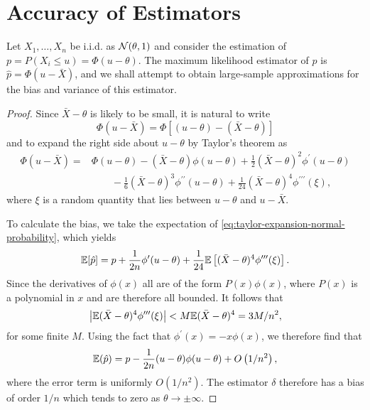 \section{Accuracy of Estimators}

\begin{example}
	Let $X_{1},\ldots,X_{n}$ be i.i.d. as ${\mathcal N}(\theta,1)$ and consider the estimation of $p=P\left(X_{i}\leq u\right)=\Phi(u-\theta)$. The maximum likelihood estimator of $p$ is $\hat{p}=\Phi(u-\bar{X})$, and we shall attempt to obtain large-sample approximations for the bias and variance of this estimator.
\end{example}

\begin{proof}
	Since $\bar{X}-\theta$ is likely to be small, it is natural to write
	\begin{equation*}
		\Phi(u-\bar{X})=\Phi[(u-\theta)-(\bar{X}-\theta)]
	\end{equation*}
	and to expand the right side about $u-\theta$ by Taylor's theorem as
	\begin{equation}
		\label{eq:taylor-expansion-normal-probability}
		\begin{aligned}
			\Phi(u-\bar{X})= & \Phi(u-\theta)-(\bar{X}-\theta)\phi(u-\theta)+\frac{1}{2}(\bar{X}-\theta)^{2}\phi^{\prime}(u-\theta)                                  \\
			                 & \qquad -\frac{1}{6}(\bar{X}-\theta)^{3}\phi^{\prime\prime}(u-\theta)+\frac{1}{24}(\bar{X}-\theta)^{4}\phi^{\prime\prime \prime}(\xi),
		\end{aligned}
	\end{equation}
	where $\xi$ is a random quantity that lies between $u-\theta$ and $u-\bar{X}$.

	To calculate the bias, we take the expectation of \eqref{eq:taylor-expansion-normal-probability}, which yields
	\begin{equation*}
		{\mathbb E}[\hat{p}]=p+\frac{1}{2n}\phi^{\prime}(u-\theta)+\frac{1}{24}{\mathbb E}\left[(\bar{X}-\theta)^4\phi^{\prime\prime\prime}(\xi)\right].
	\end{equation*}
	Since the derivatives of $\phi(x)$ all are of the form $P(x)\phi(x)$, where $P(x)$ is a polynomial in $x$ and are therefore all bounded. It follows that
	\begin{equation*}
		\left|{\mathbb E}(\bar{X}-\theta)^{4}\phi^{\prime\prime\prime}(\xi)\right|<M{\mathbb E}(\bar{X}-\theta)^{4}=3M/n^2,
	\end{equation*}
	for some finite $M$. Using the fact that $\phi^{\prime}(x)=-x \phi(x)$, we therefore find that
	\begin{equation*}
		{\mathbb E}(\hat{p})=p-\frac{1}{2n}(u-\theta)\phi(u-\theta)+O\left(1/n^{2}\right),
	\end{equation*}
	where the error term is uniformly $O\left(1 / n^2\right)$.
	The estimator $\delta$ therefore has a bias of order $1/n$ which tends to zero as $\theta \rightarrow \pm \infty$.


\end{proof}
